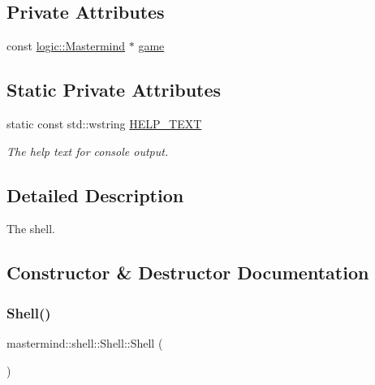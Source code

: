 \subsection*{Private Attributes}
\begin{DoxyCompactItemize}
\item 
const \hyperlink{classmastermind_1_1logic_1_1_mastermind}{logic\+::\+Mastermind} $\ast$ \hyperlink{classmastermind_1_1shell_1_1_shell_a12f951c05bb022b96f380cfb88a98e15}{game}
\end{DoxyCompactItemize}
\subsection*{Static Private Attributes}
\begin{DoxyCompactItemize}
\item 
static const std\+::wstring \hyperlink{classmastermind_1_1shell_1_1_shell_aace07f09e5898a12bdb7ce9dac2ade13}{H\+E\+L\+P\+\_\+\+T\+E\+XT}
\begin{DoxyCompactList}\small\item\em The help text for console output. \end{DoxyCompactList}\end{DoxyCompactItemize}


\subsection{Detailed Description}
The shell. 

\subsection{Constructor \& Destructor Documentation}
\hypertarget{classmastermind_1_1shell_1_1_shell_accc6d14d851bf9adf00c93837c5f1526}{}\label{classmastermind_1_1shell_1_1_shell_accc6d14d851bf9adf00c93837c5f1526} 
\subsubsection{\texorpdfstring{Shell()}{Shell()}}
{\footnotesize\ttfamily mastermind\+::shell\+::\+Shell\+::\+Shell (\begin{DoxyParamCaption}{ }\end{DoxyParamCaption})}



